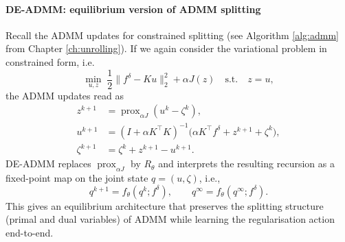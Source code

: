 \paragraph{DE-ADMM: equilibrium version of ADMM splitting}
Recall the ADMM updates for constrained splitting (see Algorithm \ref{alg:admm} from Chapter \ref{ch:unrolling}). If we again consider the variational problem in constrained form, i.e.
\begin{equation*}
    \min_{u,z} \; \frac{1}{2}\|f^\delta-Ku\|_2^2 + \alpha J(z) \quad \text{s.t.} \quad z=u,
\end{equation*}
the ADMM updates read as
\begin{align*}
z^{k+1}&=\operatorname{prox}_{\alpha J}(u^k-\zeta^k),\\
u^{k+1}&=(I+\alpha K^\top K)^{-1}\bigl(\alpha K^\top f^\delta + z^{k+1}+\zeta^k\bigr),\\
\zeta^{k+1}&=\zeta^k+z^{k+1}-u^{k+1}.
\end{align*}
DE-ADMM replaces $\operatorname{prox}_{\alpha J}$ by $R_\theta$ and interprets the resulting recursion as a fixed-point map on the joint state $q=(u,\zeta)$, i.e.,
\begin{equation*}
    q^{k+1}=f_\theta(q^k;f^\delta), \qquad q^\infty=f_\theta(q^\infty;f^\delta).
\end{equation*}
This gives an equilibrium architecture that preserves the splitting structure (primal and dual variables) of ADMM while learning the regularisation action end-to-end.

